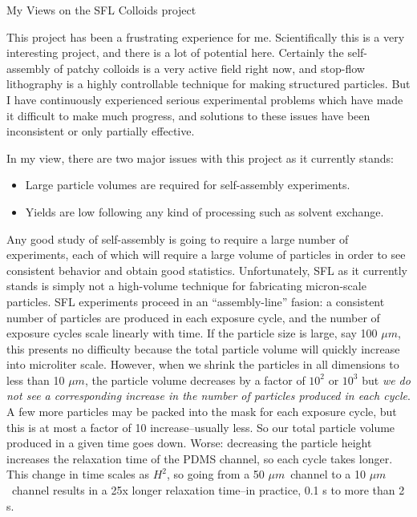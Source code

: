 \documentclass[11pt]{article}
\newcommand{\bigsection}[1]{	
	\vspace{4pt}
	{\fontfamily{phv}\selectfont\Large#1}

}
\newcommand{\microns}{$\mu m$}
\begin{document}
\pagebreak

\bigsection{My Views on the SFL Colloids project}

This project has been a frustrating experience for me.  Scientifically this is a very interesting project, and there is a lot of potential here.  Certainly the self-assembly of
patchy colloids is a very active field right now, and stop-flow lithography is a highly controllable technique for making structured particles.
But I have continuously experienced serious
experimental problems which have made it difficult to make much progress, and solutions to these issues have been inconsistent or only partially effective.

In my view, there are two major issues with this project as it currently stands:
\begin{itemize}
\item Large particle volumes are required for self-assembly experiments.
\item Yields are low following any kind of processing such as solvent exchange.
\end{itemize}

Any good study of self-assembly is going to require a large number of experiments, each of which will require a large volume of particles in order to see consistent behavior and 
obtain good statistics.  Unfortunately, SFL as it currently stands is simply not a high-volume technique for fabricating micron-scale particles.  SFL experiments proceed in an 
``assembly-line'' fasion: a consistent number of particles are produced in each exposure cycle, and the number of exposure cycles scale linearly with time.  If the particle size is 
large, say 100 \microns, this presents no difficulty because the total particle volume will quickly increase into microliter scale.  However, when we shrink the particles in all dimensions to 
less than 10 \microns, the particle volume decreases by a factor of $10^2$ or $10^3$ but \textit{we do not see a corresponding increase in the number of particles produced in each cycle}. 
A few more particles may be packed into the mask for each exposure cycle, but this is at most a factor of 10 increase--usually less.  So our total particle volume produced in a given time goes down.
Worse: decreasing the particle height increases the relaxation time of the PDMS channel, so each cycle takes longer.  This change in time scales as $H^2$, so going from a 50 \microns\ channel to a 
10 \microns\ channel results in a 25x longer relaxation time--in practice, 0.1 s to more than 2 s.  
\end{document}
